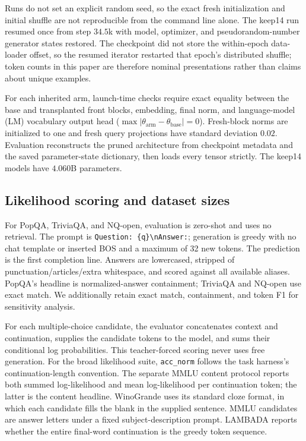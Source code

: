 Runs do not set an explicit random seed, so the exact fresh initialization and
initial shuffle are not reproducible from the command line alone. The keep14 run
resumed once from step $34.5$k with model, optimizer, and pseudorandom-number
generator states restored. The checkpoint did not store the within-epoch
data-loader offset, so the resumed iterator restarted that epoch's distributed
shuffle; token counts in this paper are therefore nominal presentations rather
than claims about unique examples.

For each inherited arm, launch-time checks require exact equality between the
base and transplanted front blocks, embedding, final norm, and language-model
(LM) vocabulary output head
($\max|\theta_{\mathrm{arm}}-\theta_{\mathrm{base}}|=0$). Fresh-block norms are
initialized to one and fresh query projections have standard deviation $0.02$.
Evaluation reconstructs the pruned architecture from checkpoint metadata and
the saved parameter-state dictionary, then loads every tensor strictly. The
keep14 models have $4.060$B parameters.

\subsection{Likelihood scoring and dataset sizes}


For PopQA, TriviaQA, and NQ-open, evaluation is zero-shot and uses no retrieval.
The prompt is \texttt{Question: \{q\}\textbackslash nAnswer:}; generation is
greedy with no chat template or inserted BOS and a maximum of 32 new tokens.
The prediction is the first completion line. Answers are lowercased, stripped
of punctuation/articles/extra whitespace, and scored against all available
aliases. PopQA's headline is normalized-answer containment; TriviaQA and
NQ-open use exact match. We additionally retain exact match, containment, and
token F1 for sensitivity analysis.

For each multiple-choice candidate, the evaluator concatenates context and
continuation, supplies the candidate tokens to the model, and sums their
conditional log probabilities. This teacher-forced scoring never uses free
generation. For the broad likelihood suite, \texttt{acc\_norm} follows the
task harness's continuation-length convention. The separate MMLU content
protocol reports both summed log-likelihood and mean log-likelihood per
continuation token; the latter is the content headline. WinoGrande uses its standard cloze format, in which each
candidate fills the blank in the supplied sentence.
MMLU candidates are answer letters under a fixed subject-description prompt.
LAMBADA reports whether the entire final-word continuation is the greedy
token sequence.

